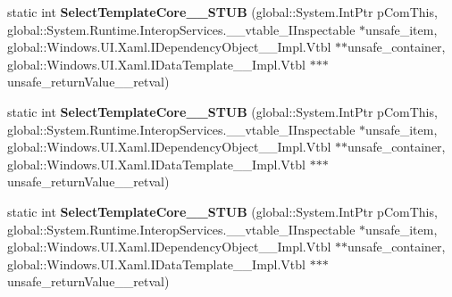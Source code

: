 \begin{DoxyCompactItemize}
\item 
\mbox{\label{struct_windows_1_1_u_i_1_1_xaml_1_1_controls_1_1_i_data_template_selector_overrides_____impl_1_1_vtbl_ab197958ac09d55ee167f2750bea8344e}} 
static int {\bfseries Select\+Template\+Core\+\_\+\+\_\+\+S\+T\+UB} (global\+::\+System.\+Int\+Ptr p\+Com\+This, global\+::\+System.\+Runtime.\+Interop\+Services.\+\_\+\+\_\+vtable\+\_\+\+I\+Inspectable $\ast$unsafe\+\_\+item, global\+::\+Windows.\+U\+I.\+Xaml.\+I\+Dependency\+Object\+\_\+\+\_\+\+Impl.\+Vtbl $\ast$$\ast$unsafe\+\_\+container, global\+::\+Windows.\+U\+I.\+Xaml.\+I\+Data\+Template\+\_\+\+\_\+\+Impl.\+Vtbl $\ast$$\ast$$\ast$unsafe\+\_\+return\+Value\+\_\+\+\_\+retval)
\item 
\mbox{\label{struct_windows_1_1_u_i_1_1_xaml_1_1_controls_1_1_i_data_template_selector_overrides_____impl_1_1_vtbl_ab197958ac09d55ee167f2750bea8344e}} 
static int {\bfseries Select\+Template\+Core\+\_\+\+\_\+\+S\+T\+UB} (global\+::\+System.\+Int\+Ptr p\+Com\+This, global\+::\+System.\+Runtime.\+Interop\+Services.\+\_\+\+\_\+vtable\+\_\+\+I\+Inspectable $\ast$unsafe\+\_\+item, global\+::\+Windows.\+U\+I.\+Xaml.\+I\+Dependency\+Object\+\_\+\+\_\+\+Impl.\+Vtbl $\ast$$\ast$unsafe\+\_\+container, global\+::\+Windows.\+U\+I.\+Xaml.\+I\+Data\+Template\+\_\+\+\_\+\+Impl.\+Vtbl $\ast$$\ast$$\ast$unsafe\+\_\+return\+Value\+\_\+\+\_\+retval)
\item 
\mbox{\label{struct_windows_1_1_u_i_1_1_xaml_1_1_controls_1_1_i_data_template_selector_overrides_____impl_1_1_vtbl_ab197958ac09d55ee167f2750bea8344e}} 
static int {\bfseries Select\+Template\+Core\+\_\+\+\_\+\+S\+T\+UB} (global\+::\+System.\+Int\+Ptr p\+Com\+This, global\+::\+System.\+Runtime.\+Interop\+Services.\+\_\+\+\_\+vtable\+\_\+\+I\+Inspectable $\ast$unsafe\+\_\+item, global\+::\+Windows.\+U\+I.\+Xaml.\+I\+Dependency\+Object\+\_\+\+\_\+\+Impl.\+Vtbl $\ast$$\ast$unsafe\+\_\+container, global\+::\+Windows.\+U\+I.\+Xaml.\+I\+Data\+Template\+\_\+\+\_\+\+Impl.\+Vtbl $\ast$$\ast$$\ast$unsafe\+\_\+return\+Value\+\_\+\+\_\+retval)
\item 
$$
\end{DoxyCompactItemize}
